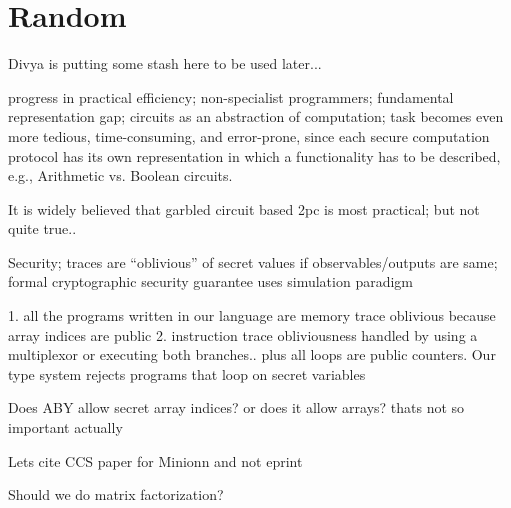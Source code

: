 \section{Random}

Divya is putting some stash here to be used later...

 progress in practical efficiency; non-specialist programmers; fundamental representation gap; circuits as an abstraction of computation; task becomes even more tedious, time-consuming, and error-prone,
since each secure computation protocol has its own
representation in which a functionality has to be described, e.g.,
Arithmetic vs. Boolean circuits.

 It is widely believed that garbled circuit based 2pc is most practical; but not quite true..

 Security; traces are ``oblivious'' of secret values if observables/outputs are same; formal cryptographic security guarantee uses simulation paradigm \cite{canetti2000} 


 1. all the programs written in our language are memory trace oblivious because array indices are public 2. instruction trace obliviousness handled by using a multiplexor or executing both branches.. plus all loops are public counters. Our type system rejects programs that loop on secret variables

 Does ABY allow secret array indices? or does it allow arrays? thats not so important actually


 Lets cite CCS paper for Minionn and not eprint

 Should we do matrix factorization?

